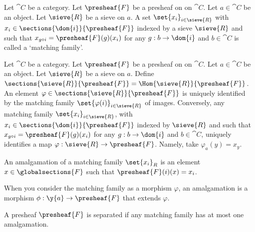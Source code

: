 \begin{definition}
Let $\cat{C}$ be a category.
Let $\presheaf{F}$ be a presheaf on on $\cat{C}$.
Let $a \in \cat{C}$ be an object.
Let $\sieve{R}$ be a sieve on $a$.
A set $\set{x_i}_{i \in \sieve{R}}$ 
with $x_i \in \sections{\dom{i}}{\presheaf{F}}$ 
indexed by a sieve $\sieve{R}$
and such that $x_{g \circ i} = \presheaf{F}(g)(x_i)$ 
for any $g:b \rightarrow \dom{i}$ 
and $b \in \cat{C}$ is called a `matching family'.
\end{definition}

\begin{definition}
Let $\cat{C}$ be a category.
Let $\presheaf{F}$ be a presheaf on on $\cat{C}$.
Let $a \in \cat{C}$ be an object.
Let $\sieve{R}$ be a sieve on $a$.
Define $\sections{\sieve{R}}{\presheaf{F}} = \Hom{\sieve{R}}{\presheaf{F}}$.
An element $\varphi \in \sections{\sieve{R}}{\presheaf{F}}$ is uniquely identified 
by the matching family $\set{\varphi(i)}_{i\in\sieve{R}}$ of images. 
Conversely, any matching family $\set{x_i}_{i \in \sieve{R}}$, 
with $x_i \in \sections{\dom{i}}{\presheaf{F}}$ indexed by $\sieve{R}$
and such that $x_{g \circ i} = \presheaf{F}(g)(x_i)$ 
for any $g:b \rightarrow \dom{i}$ and $b \in \cat{C}$, uniquely identifies 
a map $\varphi: \sieve{R} \rightarrow \presheaf{F}$.
Namely, take $\varphi_a(y) = x_y$.
\end{definition}

\begin{definition}[Amalgamation]
An amalgamation of a matching family $\set{x_i}_R$ 
is an element $x\in \globalsections{F}$
such that $\presheaf{F}(i)(x) = x_i$.

When you consider the matching family as a morphism $\varphi$,
an amalgamation is a morphism $\phi: \y{a} \rightarrow \presheaf{F}$
that extends $\varphi$.
\end{definition}

\begin{definition}
A presheaf $\presheaf{F}$ is separated if any matching family has at most one amalgamation.
\end{definition}